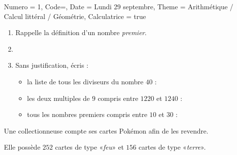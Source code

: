 \documentclass[11pt]{article}
\newcommand{\ligne}{{\color{gray!60}\hrulefill}}
\begin{document}
\begin{Maquette}[IE]{
        Numero = 1, Code={}, Date = Lundi 29 septembre, Theme = Arithmétique / Calcul littéral / Géométrie, Calculatrice = true
    }


    \begin{exercice}
        \begin{enumerate}
            \item {} Rappelle la définition d’un nombre \emph{premier}. \ligne
            \item[] \ligne
            \item Sans justification, écris :
                  \begin{itemize}
                      \item {}la liste de tous les diviseurs du nombre $40$ : \ligne
                      \item {}les deux multiples de $9$ compris entre $1220$ et $1240$ : \ligne
                      \item {}tous les nombres premiers compris entre $10$ et $30$ : \ligne
                  \end{itemize}
        \end{enumerate}
    \end{exercice}

    \begin{exercice}
        Une collectionneuse compte ses cartes Pokémon afin de les revendre.

        Elle possède $252$ cartes de type «\emph{feu}» et $156$ cartes de type «\emph{terre}».


\end{exercice}
\end{Maquette}
\end{document}
